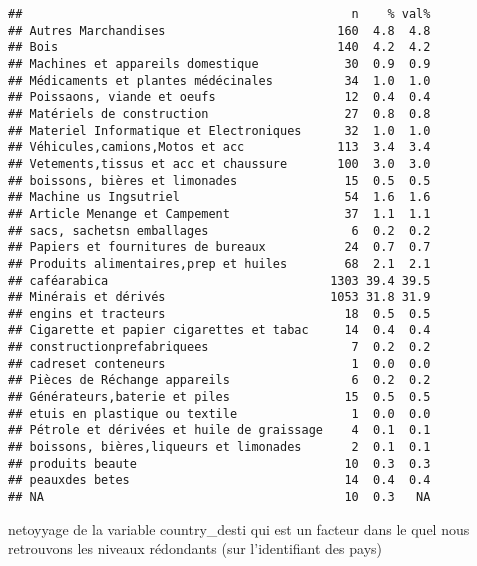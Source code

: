 \documentclass[
]{book}
\begin{document}
\begin{verbatim}
##                                              n    % val%
## Autres Marchandises                        160  4.8  4.8
## Bois                                       140  4.2  4.2
## Machines et appareils domestique            30  0.9  0.9
## Médicaments et plantes médécinales          34  1.0  1.0
## Poissaons, viande et oeufs                  12  0.4  0.4
## Matériels de construction                   27  0.8  0.8
## Materiel Informatique et Electroniques      32  1.0  1.0
## Véhicules,camions,Motos et acc             113  3.4  3.4
## Vetements,tissus et acc et chaussure       100  3.0  3.0
## boissons, bières et limonades               15  0.5  0.5
## Machine us Ingsutriel                       54  1.6  1.6
## Article Menange et Campement                37  1.1  1.1
## sacs, sachetsn emballages                    6  0.2  0.2
## Papiers et fournitures de bureaux           24  0.7  0.7
## Produits alimentaires,prep et huiles        68  2.1  2.1
## caféarabica                               1303 39.4 39.5
## Minérais et dérivés                       1053 31.8 31.9
## engins et tracteurs                         18  0.5  0.5
## Cigarette et papier cigarettes et tabac     14  0.4  0.4
## constructionprefabriquees                    7  0.2  0.2
## cadreset conteneurs                          1  0.0  0.0
## Pièces de Réchange appareils                 6  0.2  0.2
## Générateurs,baterie et piles                15  0.5  0.5
## etuis en plastique ou textile                1  0.0  0.0
## Pétrole et dérivées et huile de graissage    4  0.1  0.1
## boissons, bières,liqueurs et limonades       2  0.1  0.1
## produits beaute                             10  0.3  0.3
## peauxdes betes                              14  0.4  0.4
## NA                                          10  0.3   NA
\end{verbatim}

netoyyage de la variable country\_desti qui est un facteur dans le quel nous retrouvons les niveaux rédondants (sur l'identifiant des pays)
\end{document}
